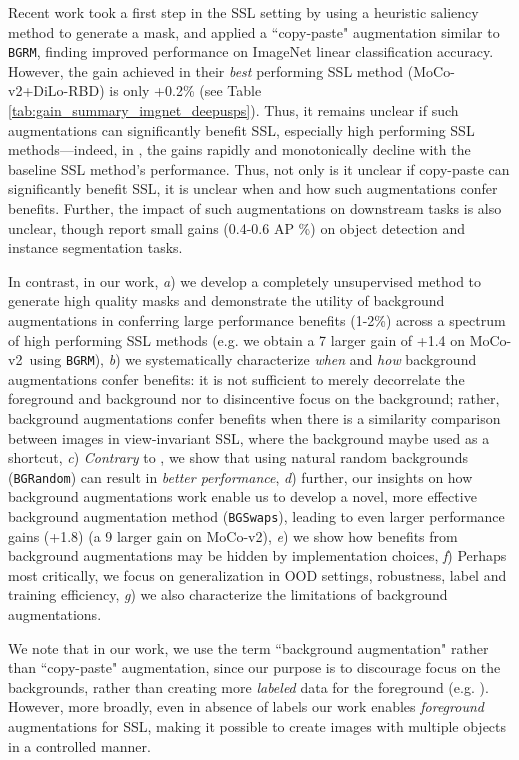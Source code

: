 \documentclass[twoside,11pt]{article}
\newcommand{\bgrm}{\texttt{BG\textunderscore RM}}
\newcommand{\bgswaps}{\texttt{BG\textunderscore Swaps}}
\newcommand{\bgrand}{\texttt{BG\textunderscore Random}}
\newcommand{\moco}{MoCo-v2}
\begin{document}
Recent work \citep{ZhaoAAAI2021} took a first step in the SSL setting by using a heuristic saliency method to generate a mask, and applied a ``copy-paste" augmentation similar to \bgrm, finding improved performance on ImageNet linear classification accuracy. However, the gain achieved in their \textit{best} performing SSL method (\moco+DiLo-RBD) is only +0.2\% (see Table \ref{tab:gain_summary_imgnet_deepusps}). Thus, it remains unclear if such augmentations can significantly benefit SSL, especially high performing SSL methods---indeed, in \citet{ZhaoAAAI2021}, the gains rapidly and monotonically decline with the baseline SSL method's performance. Thus, not only is it unclear if copy-paste can significantly benefit SSL, it is unclear when and how such augmentations confer benefits. Further, the impact of such augmentations on downstream tasks is also unclear, though \citet{ZhaoAAAI2021} report small gains (0.4-0.6 AP \%) on object detection and instance segmentation tasks.

In contrast, in our work, \textit{a}) we develop a completely unsupervised method to generate high quality masks and demonstrate the utility of background augmentations in conferring large performance benefits (1-2\%) across a spectrum of high performing SSL methods (e.g. we obtain a 7 larger gain of +1.4 on \moco~using \bgrm), \textit{b}) we systematically characterize \textit{when} and \textit{how} background augmentations confer benefits: it is not sufficient to merely decorrelate the foreground and background nor to disincentive focus on the background; rather, background augmentations confer benefits when there is a similarity comparison between images in view-invariant SSL, where the background maybe used as a shortcut, \textit{c}) \textit{Contrary} to \citet{ZhaoAAAI2021}, we show that using natural random backgrounds (\bgrand) can result in \textit{better performance}, \textit{d}) further, our insights on how background augmentations work enable us to develop a novel, more effective background augmentation method (\bgswaps), leading to even larger performance gains (+1.8) (a 9 larger gain on \moco), \textit{e}) we show how benefits from background augmentations may be hidden by implementation choices, \textit{f}) Perhaps most critically, we focus on generalization in OOD settings, robustness, label and training efficiency, \textit{g}) we also characterize the limitations of background augmentations. 

 We note that in our work, we use the term ``background augmentation" rather than ``copy-paste" augmentation, since our purpose is to discourage focus on the backgrounds, rather than creating more \textit{labeled} data for the foreground (e.g. \citet{ghiasi2020simple,Dwibedi_2017_ICCV}). However, more broadly, even in absence of labels our work enables \textit{foreground} augmentations for SSL, making it possible to create images with multiple objects in a controlled manner.
\end{document}
